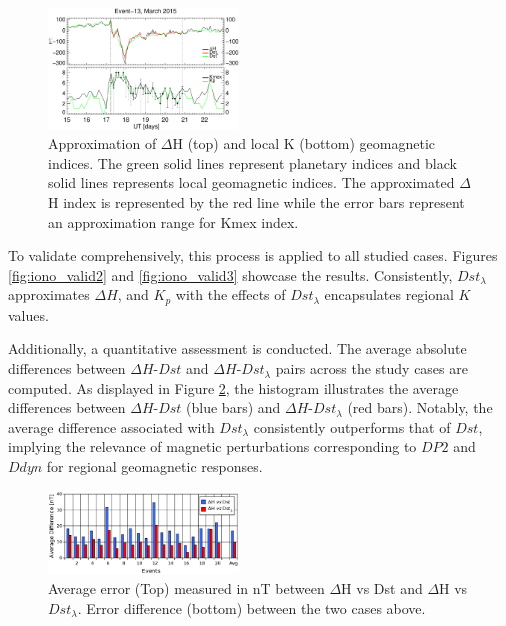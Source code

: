 \documentclass[a4paper,fleqn]{cas-dc}
\begin{document}
\begin{figure}
\centering
    \includegraphics[width=0.45\textwidth]{images/dH_approx/diono_valid_V4_2015-03-15.eps}
    \caption{Approximation of $\Delta$H (top) and local K (bottom) geomagnetic indices. The green solid lines represent planetary indices and black solid lines represents local geomagnetic indices. The approximated $\Delta$H index is represented by the red line while the error bars represent an approximation range for Kmex index.}
    \label{fig:iono_valid}
\end{figure}

To validate comprehensively, this process is applied to all studied cases. Figures \ref{fig:iono_valid2} and \ref{fig:iono_valid3} showcase the results. Consistently, $ Dst_\lambda$ approximates $\Delta H$, and $K_p$ with the effects of $Dst_\lambda$ encapsulates regional $K$ values.

Additionally, a quantitative assessment is conducted. The average absolute differences between $\Delta H$-$Dst$ and $\Delta H$-$Dst_\lambda$ pairs across the study cases are computed. As displayed in Figure \ref{fig:valid}, the histogram illustrates the average differences between $\Delta H$-$Dst$ (blue bars) and $\Delta H$-$Dst_\lambda$ (red bars). Notably, the average difference associated with $Dst_\lambda$ consistently outperforms that of $Dst$, implying the relevance of magnetic perturbations corresponding to $DP2$ and $Ddyn$ for regional geomagnetic responses.

\begin{figure}
\centering
    \includegraphics[width=0.45\textwidth]{images/prom_dist.eps}
    \caption{Average error (Top) measured in nT between $\Delta$H vs Dst and $\Delta$H vs $Dst_\lambda$. Error difference (bottom) between the two cases above.}
    \label{fig:valid}
\end{figure}
\end{document}
